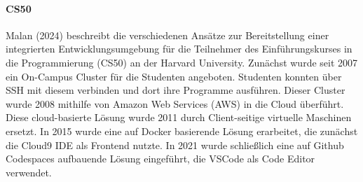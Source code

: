 \paragraph{CS50}
Malan (2024) \cite{malan_containerizing_2024} beschreibt die verschiedenen Ansätze zur Bereitstellung einer integrierten Entwicklungsumgebung für die Teilnehmer des Einführungskurses in die Programmierung (CS50) an der Harvard University. Zunächst wurde seit 2007 ein On-Campus Cluster für die Studenten angeboten. Studenten konnten über SSH mit diesem verbinden und dort ihre Programme ausführen. Dieser Cluster wurde 2008 mithilfe von Amazon Web Services (AWS) \cite{noauthor_amazon_nodate} in die Cloud überführt. Diese cloud-basierte Lösung wurde 2011 durch Client-seitige virtuelle Maschinen ersetzt. In 2015 wurde eine auf Docker basierende Lösung erarbeitet, die zunächst die Cloud9 IDE \cite{noauthor_aws-cloud9_nodate} als Frontend nutzte. In 2021 wurde schließlich eine auf Github Codespaces aufbauende Lösung eingeführt, die \ac{VSCode} \cite{noauthor_vscode_nodate} als Code Editor verwendet.